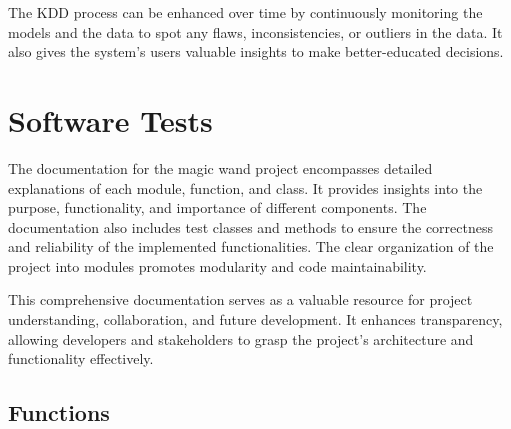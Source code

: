 		The KDD process can be enhanced over time by continuously monitoring the models and the data to spot any flaws, inconsistencies, or outliers in the data. It also gives the system’s users valuable insights to make better-educated decisions.
		
		
\chapter{Software Tests }
\label{chapter:SoftwareTests}

	The documentation for the magic wand project encompasses detailed explanations of each module, function, and class. It provides insights into the purpose, functionality, and importance of different components. The documentation also includes test classes and methods to ensure the correctness and reliability of the implemented functionalities. The clear organization of the project into modules promotes modularity and code maintainability.
	
	This comprehensive documentation serves as a valuable resource for project understanding, collaboration, and future development. It enhances transparency, allowing developers and stakeholders to grasp the project's architecture and functionality effectively.
	
	\section{Functions}
	
